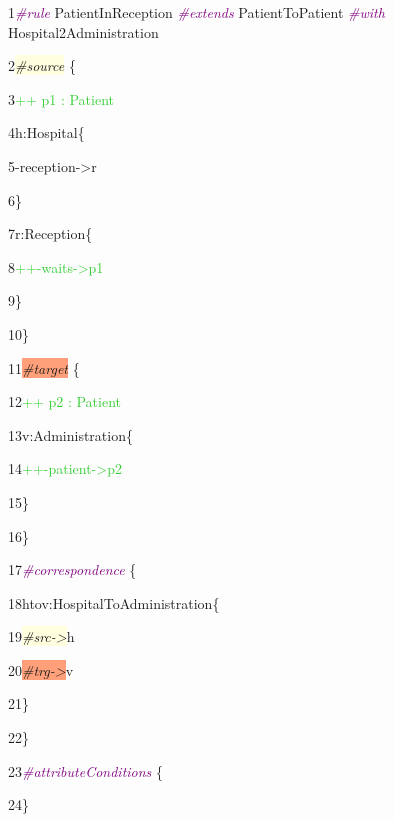 {

1\hspace{0.5cm}\textcolor{Purple}{\textit{\#rule}} PatientInReception \textcolor{Purple}{\textit{\#extends}} PatientToPatient \textcolor{Purple}{\textit{\#with}} Hospital2Administration

2\hspace{0.5cm}\colorbox{LightYellow}{\textit{\#source}} \{ 

3\hspace{1cm}\textcolor{LimeGreen}{++ p1 : Patient}

4\hspace{1cm}h:Hospital\{

5\hspace{1.5cm}-reception->r

6\hspace{1cm}\}

7\hspace{1cm}r:Reception\{

8\hspace{1.5cm}\textcolor{LimeGreen}{++-waits->p1}

9\hspace{1cm}\}

10\hspace{0.5cm}\}

11\hspace{0.5cm}\colorbox{LightSalmon}{\textit{\#target}} \{

12\hspace{1cm}\textcolor{LimeGreen}{++ p2 : Patient}

13\hspace{1cm}v:Administration\{

14\hspace{1.5cm}\textcolor{LimeGreen}{++-patient->p2}

15\hspace{1cm}\}

16\hspace{0.5cm}\}

17\hspace{0.5cm}\textcolor{Purple}{\textit{\#correspondence}} \{
	
18\hspace{1cm}htov:HospitalToAdministration\{

19\hspace{1.5cm}\colorbox{LightYellow}{\textit{\#src->}}h
			
20\hspace{1.5cm}\colorbox{LightSalmon}{\textit{\#trg->}}v

21\hspace{1cm}\}

22\hspace{0.5cm}\}

23\hspace{0.5cm}\textcolor{Purple}{\textit{\#attributeConditions}} \{

24\hspace{0.5cm}\}

}

